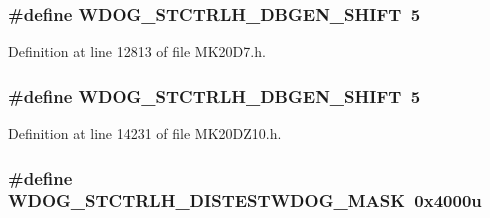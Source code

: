 \subsubsection[{\texorpdfstring{W\+D\+O\+G\+\_\+\+S\+T\+C\+T\+R\+L\+H\+\_\+\+D\+B\+G\+E\+N\+\_\+\+S\+H\+I\+FT}{WDOG_STCTRLH_DBGEN_SHIFT}}]{\setlength{\rightskip}{0pt plus 5cm}\#define W\+D\+O\+G\+\_\+\+S\+T\+C\+T\+R\+L\+H\+\_\+\+D\+B\+G\+E\+N\+\_\+\+S\+H\+I\+FT~5}\hypertarget{group___w_d_o_g___register___masks_ga9fdcaa733bd0393d4bce730c1d2c90c5}{}\label{group___w_d_o_g___register___masks_ga9fdcaa733bd0393d4bce730c1d2c90c5}


Definition at line 12813 of file M\+K20\+D7.\+h.

\subsubsection[{\texorpdfstring{W\+D\+O\+G\+\_\+\+S\+T\+C\+T\+R\+L\+H\+\_\+\+D\+B\+G\+E\+N\+\_\+\+S\+H\+I\+FT}{WDOG_STCTRLH_DBGEN_SHIFT}}]{\setlength{\rightskip}{0pt plus 5cm}\#define W\+D\+O\+G\+\_\+\+S\+T\+C\+T\+R\+L\+H\+\_\+\+D\+B\+G\+E\+N\+\_\+\+S\+H\+I\+FT~5}\hypertarget{group___w_d_o_g___register___masks_ga9fdcaa733bd0393d4bce730c1d2c90c5}{}\label{group___w_d_o_g___register___masks_ga9fdcaa733bd0393d4bce730c1d2c90c5}


Definition at line 14231 of file M\+K20\+D\+Z10.\+h.

\subsubsection[{\texorpdfstring{W\+D\+O\+G\+\_\+\+S\+T\+C\+T\+R\+L\+H\+\_\+\+D\+I\+S\+T\+E\+S\+T\+W\+D\+O\+G\+\_\+\+M\+A\+SK}{WDOG_STCTRLH_DISTESTWDOG_MASK}}]{\setlength{\rightskip}{0pt plus 5cm}\#define W\+D\+O\+G\+\_\+\+S\+T\+C\+T\+R\+L\+H\+\_\+\+D\+I\+S\+T\+E\+S\+T\+W\+D\+O\+G\+\_\+\+M\+A\+SK~0x4000u}\hypertarget{group___w_d_o_g___register___masks_gadc235bcbd7644d445d3ca5cb682cdc57}{}\label{group___w_d_o_g___register___masks_gadc235bcbd7644d445d3ca5cb682cdc57}


